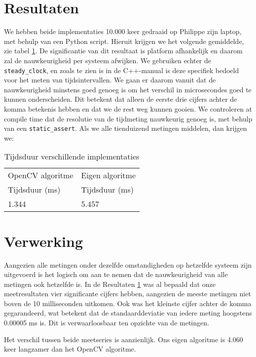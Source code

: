 \documentclass[a4paper]{article}
\begin{document}
\section{Resultaten}
\label{sec:orgfd66c7e}
We hebben beide implementaties 10.000 keer gedraaid op Philippe zijn laptop, met behulp van een Python script. Hieruit krijgen we het volgende gemiddelde, zie tabel \ref{tab:orga5d33a7}. De significantie van dit resultaat is platform afhankelijk en daarom zal de nauwkeurigheid per systeem afwijken. We gebruiken echter de \texttt{steady\_clock}, en zoals te zien is in de C++-manual is deze specifiek bedoeld voor het meten van tijdsintervallen. We gaan er daarom vanuit dat de nauwkeurigheid minstens goed genoeg is om het verschil in microsecondes goed te kunnen onderscheiden. Dit betekent dat alleen de eerste drie cijfers achter de komma betekenis hebben en dat we de rest weg kunnen gooien. We controleren at compile time dat de resolutie van de tijdmeting nauwkeurig genoeg is, met behulp van een \texttt{static\_assert}. Als we alle tienduizend metingen middelen, dan krijgen we:

\begin{table}[htbp]
\caption{\label{tab:orga5d33a7}
Tijdsduur verschillende implementaties}
\centering
\begin{tabular}{ll}
OpenCV algoritme & Eigen algoritme\\
Tijdsduur (ms) & Tijdsduur (ms)\\
\hline
1.344 & 5.457\\
\end{tabular}
\end{table}

\section{Verwerking}
\label{sec:orgfdaec9c}
Aangezien alle metingen onder dezelfde omstandigheden op hetzelfde systeem zijn uitgevoerd is het logisch om aan te nemen dat de nauwkeurigheid van alle metingen ook hetzelfde is. In de Resultaten \ref{sec:orgfd66c7e} was al bepaald dat onze meetresultaten vier significante cijfers hebben, aangezien de meeste metingen niet boven de 10 milliseconden uitkomen. Ook was het kleinste cijfer achter de komma gegarandeerd, wat betekent dat de standaarddeviatie van iedere meting hoogstens 0.00005 ms is. Dit is verwaarloosbaar ten opzichte van de metingen.

Het verschil tussen beide meetseries is aanzienlijk. Ons eigen algoritme is 4.060 keer langzamer dan het OpenCV algoritme.
\end{document}
